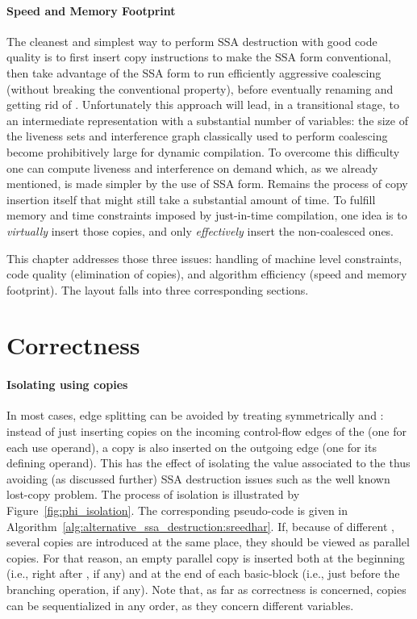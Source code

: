 \paragraph{Speed and Memory Footprint}
The cleanest and simplest way to perform SSA destruction with good code quality is to first insert copy instructions to make the SSA form conventional, then take advantage of the SSA form to run efficiently aggressive coalescing (without breaking the conventional property), before eventually renaming \phiwebs\index{\phiweb} and getting rid of \phifuns. 
Unfortunately this approach will lead, in a transitional stage, to an intermediate representation with a substantial number of variables: 
the size of the liveness sets and interference graph classically used to perform coalescing become prohibitively large for dynamic compilation. 
To overcome this difficulty one can compute liveness and interference on demand which, as we already mentioned, is made simpler by the use of SSA form. 
Remains the process of copy insertion itself that might still take a substantial amount of time. 
To fulfill memory and time constraints imposed by just-in-time compilation, one idea is to \emph{virtually} insert those copies, and only \emph{effectively} insert the non-coalesced ones.

This chapter addresses those three issues: 
handling of machine level constraints, code quality (elimination of copies), and algorithm efficiency (speed and memory footprint). 
The layout falls into three corresponding sections.

\section{Correctness}

\paragraph{Isolating \phinode using copies}
In most cases, edge splitting can be avoided by treating symmetrically \phiuses and \phidef: 
instead of just inserting copies on the incoming control-flow edges of the \phinode (one for each use operand), a copy is also inserted on the outgoing edge (one for its defining operand). 
This has the effect of isolating the value associated to the \phinode thus avoiding (as discussed further) SSA destruction issues such as the well known lost-copy problem. 
The process of \phinode isolation is illustrated by Figure~\ref{fig:phi_isolation}. 
The corresponding pseudo-code is given in Algorithm~\ref{alg:alternative_ssa_destruction:sreedhar}. 
If, because of different \phifuns, several copies are introduced at the same place, they should be viewed as parallel copies. 
For that reason, an empty parallel copy is inserted both at the beginning (i.e., right after \phifuns, if any) and at the end of each basic-block (i.e., just before the branching operation, if any). 
Note that, as far as correctness is concerned, copies can be sequentialized in any order, as they concern different variables.

